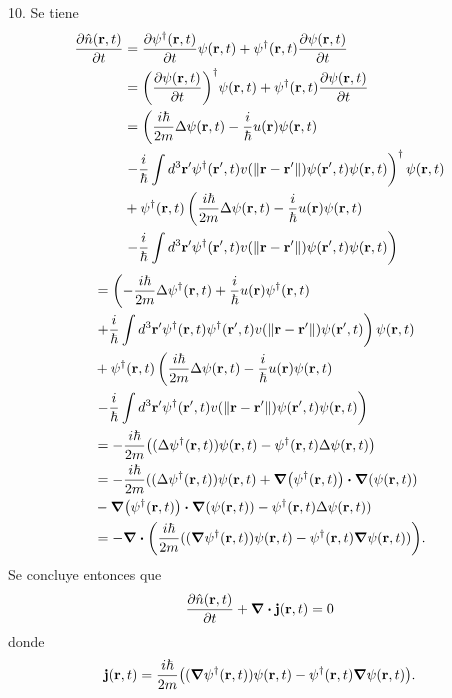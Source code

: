 \documentclass{article}
\begin{document}
10. Se tiene
\begin{align}
\begin{split}
\frac{\partial \hat{n}(\vb{r},t)}{\partial t}&=\frac{\partial\psi^\dagger(\vb{r},t)}{\partial t}\psi(\vb{r},t)+\psi^\dagger(\vb{r},t)\frac{\partial\psi(\vb{r},t)}{\partial t}\\
&=\qty(\frac{\partial\psi(\vb{r},t)}{\partial t})^\dagger\psi(\vb{r},t)+\psi^\dagger(\vb{r},t)\frac{\partial\psi(\vb{r},t)}{\partial t}\\
&=\left(\frac{i\hbar}{2m}\Delta\psi(\vb{r},t)-\frac{i}{\hbar}u(\vb{r})\psi(\vb{r},t)\right.\\
&\left.-\frac{i}{\hbar}\int d^3\vb{r}'\psi^\dagger(\vb{r}',t)v(\|\vb{r}-\vb{r}'\|)\psi(\vb{r}',t)\psi(\vb{r},t)\right)^\dagger\psi(\vb{r},t)\\
&+\psi^\dagger(\vb{r},t)\left(\frac{i\hbar}{2m}\Delta\psi(\vb{r},t)-\frac{i}{\hbar}u(\vb{r})\psi(\vb{r},t)\right.\\
&\left.-\frac{i}{\hbar}\int d^3\vb{r}'\psi^\dagger(\vb{r}',t)v(\|\vb{r}-\vb{r}'\|)\psi(\vb{r}',t)\psi(\vb{r},t)\right)\\
\end{split}
\end{align}
\begin{align*}
&=\left(-\frac{i\hbar}{2m}\Delta\psi^\dagger(\vb{r},t)+\frac{i}{\hbar}u(\vb{r})\psi^\dagger(\vb{r},t)\right.\\
&\left.+\frac{i}{\hbar}\int d^3\vb{r}'\psi^\dagger(\vb{r},t)\psi^\dagger(\vb{r}',t)v(\|\vb{r}-\vb{r}'\|)\psi(\vb{r}',t)\right)\psi(\vb{r},t)\\
&+\psi^\dagger(\vb{r},t)\left(\frac{i\hbar}{2m}\Delta\psi(\vb{r},t)-\frac{i}{\hbar}u(\vb{r})\psi(\vb{r},t)\right.\\
&\left.-\frac{i}{\hbar}\int d^3\vb{r}'\psi^\dagger(\vb{r}',t)v(\|\vb{r}-\vb{r}'\|)\psi(\vb{r}',t)\psi(\vb{r},t)\right)\\
&=-\frac{i\hbar}{2m}\qty((\Delta\psi^\dagger(\vb{r},t))\psi(\vb{r},t)-\psi^\dagger(\vb{r},t)\Delta\psi(\vb{r},t))\\
&=-\frac{i\hbar}{2m}((\Delta\psi^\dagger(\vb{r},t))\psi(\vb{r},t)+\grad(\psi^\dagger(\vb{r},t))\vdot\grad(\psi(\vb{r},t))\\
&-\grad(\psi^\dagger(\vb{r},t))\vdot\grad(\psi(\vb{r},t))-\psi^\dagger(\vb{r},t)\Delta\psi(\vb{r},t))\\
&=-\div(\frac{i\hbar}{2m}((\grad{\psi^\dagger}(\vb{r},t))\psi(\vb{r},t)-\psi^\dagger(\vb{r},t)\grad{\psi(\vb{r},t)})).
\end{align*}
Se concluye entonces que
\begin{equation}
\frac{\partial \hat{n}(\vb{r},t)}{\partial t}+\div{\vb{j}}(\vb{r},t)=0
\end{equation}
donde
\begin{equation}
\vb{j}(\vb{r},t)=\frac{i\hbar}{2m}\qty((\grad{\psi^\dagger}(\vb{r},t))\psi(\vb{r},t)-\psi^\dagger(\vb{r},t)\grad{\psi(\vb{r},t)}).
\end{equation}
\end{document}
